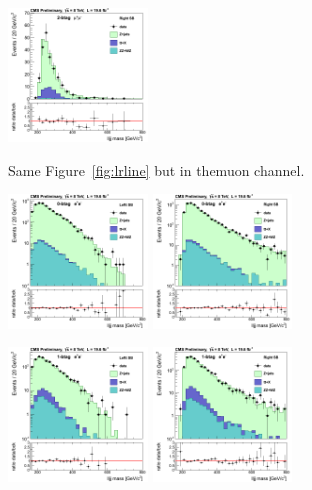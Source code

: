 \begin{figure}[htb]
{\includegraphics[width=0.33\textwidth]{plots/approvalxchecks/Right_2b_mmlin.png}
}
\caption{Same Figure~\ref{fig:lrline} but in themuon channel.
\label{fig:lrlinmu}
}
\end{figure}

\begin{figure}[htb]
\centerline{
\includegraphics[width=0.33\textwidth]{plots/approvalxchecks/Left_0b_ee.png}
\includegraphics[width=0.33\textwidth]{plots/approvalxchecks/Right_0b_ee.png}
}
\centerline{
\includegraphics[width=0.33\textwidth]{plots/approvalxchecks/Left_1b_ee.png}
\includegraphics[width=0.33\textwidth]{plots/approvalxchecks/Right_1b_ee.png}
}
\end{figure}
